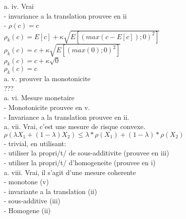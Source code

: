 a. iv. Vrai \\
- invariance a la translation prouvee en ii\\
- $\rho(c) = c$\\


$\rho_k(c) = E[c] + \kappa \sqrt{E[(max(c-E[c]); 0)^2]}$\\
$\rho_k(c) = c + \kappa \sqrt{E[(max(0); 0)^2]}$\\
$\rho_k(c) = c + \kappa \sqrt{0}$\\
$\rho_k(c) = c $\\


a. v. prouver la monotonicite\\
???\\

a. vi. Mesure monetaire\\
- Monotonicite prouvee en v.\\
- Invariance a la translation prouvee en ii.\\ 

a. vii. Vrai, c'est une mesure de risque convexe. \\
$\rho(\lambda X_1 + (1-\lambda)X_2) \leq \lambda*\rho(X_1) + (1-\lambda)*\rho(X_2)$\\
- trivial, en utilisant:\\
- utiliser la propri/t/ de sous-additivite (prouvee en iii)\\
- utiliser la propri/t/ d'homogeneite (prouvee en i)\\

a. viii. Vrai, il s'agit d'une mesure coherente\\
- monotone (v)\\
- invariante a la translation (ii)\\
- sous-additive (iii)\\
- Homogene (ii)\\